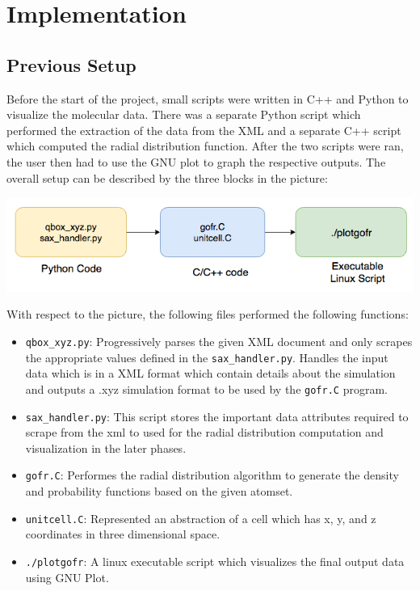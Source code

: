 \section*{Implementation}

\subsection*{Previous Setup}

Before the start of the project, small scripts were written in C++ and Python to visualize the molecular data. There was a separate Python script which performed the extraction of the data from the XML and a separate C++ script which computed the radial distribution function. After the two scripts were ran, the user then had to use the GNU plot to graph the respective outputs. The overall setup can be described by the three blocks in the picture:


\includegraphics[scale=0.50]{images/old_pipeline}\newline


With respect to the picture, the following files performed the following functions: 

\begin{itemize}
        
    \item \verb|qbox_xyz.py|: Progressively parses the given XML document and only scrapes the appropriate values defined in the \verb|sax_handler.py|. Handles the input data which is in a XML format which contain details about the simulation and outputs a .xyz simulation format to be used by the \verb|gofr.C| program.
    
    \item \verb|sax_handler.py|: This script stores the important data attributes required to scrape from the xml to used for the radial distribution computation and visualization in the later phases.

    \item \verb|gofr.C|: Performes the radial distribution algorithm to generate the density and probability functions based on the given atomset.
    
    \item \verb|unitcell.C|: Represented an abstraction of a cell which has x, y, and z coordinates in three dimensional space.
    
    \item \verb|./plotgofr|: A linux executable script which visualizes the final output data using GNU Plot.
    
\end{itemize}





